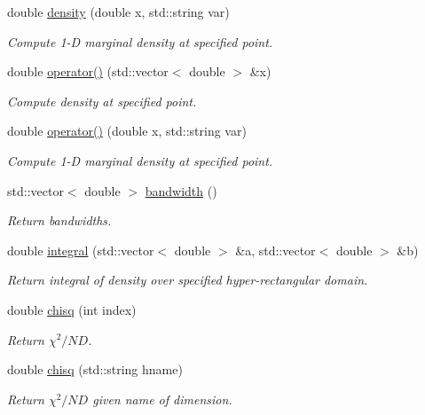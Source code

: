 \begin{CompactItemize}
double \hyperlink{classKDE_a9}{density} (double x, std::string var)
\begin{CompactList}\small\item\em Compute 1-D marginal density at specified point. \item\end{CompactList}\item 
double \hyperlink{classKDE_a10}{operator()} (std::vector$<$ double $>$ \&x)
\begin{CompactList}\small\item\em Compute density at specified point. \item\end{CompactList}\item 
double \hyperlink{classKDE_a11}{operator()} (double x, std::string var)
\begin{CompactList}\small\item\em Compute 1-D marginal density at specified point. \item\end{CompactList}\item 
std::vector$<$ double $>$ \hyperlink{classKDE_a12}{bandwidth} ()
\begin{CompactList}\small\item\em Return bandwidths. \item\end{CompactList}\item 
double \hyperlink{classKDE_a13}{integral} (std::vector$<$ double $>$ \&a, std::vector$<$ double $>$ \&b)
\begin{CompactList}\small\item\em Return integral of density over specified hyper-rectangular domain. \item\end{CompactList}\item 
double \hyperlink{classKDE_a14}{chisq} (int index)
\begin{CompactList}\small\item\em Return $\chi^2/ND$. \item\end{CompactList}\item 
double \hyperlink{classKDE_a15}{chisq} (std::string hname)
\begin{CompactList}\small\item\em Return $\chi^2/ND$ given name of dimension. \item\end{CompactList}\item 

\end{CompactItemize}

